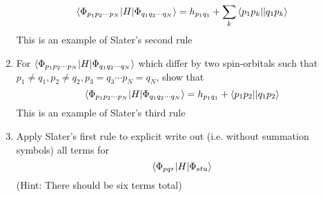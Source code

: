 \documentclass{article}
\newcommand{\cd}{\ensuremath{\cdots} }
\begin{document}
\begin{enumerate}
 \[\braket{\Phi_{p_1 p_2 \cd p_N} | H | \Phi_{q_1 q_2 \cd q_N} } = h_{p_1 q_1}  + \sum_k \braket{p_1 p_k || q_1 p_k}  \]
 This is an example of Slater's second rule
 
 \item For $\braket{\Phi_{p_1 p_2 \cd p_N} | H | \Phi_{q_1 q_2 \cd q_N} }$ which differ by two spin-orbitals such that $p_1 \neq q_1, p_2 \neq q_2, p_3 = q_3 \cd p_N = q_N$, show that
\[\braket{\Phi_{p_1 p_2 \cd p_N} | H | \Phi_{q_1 q_2 \cd q_N} } = h_{p_1 q_1}  +  \braket{p_1 p_2 || q_1 p_2}  \]
   This is an example of Slater's third rule
 \item Apply Slater's first rule to explicit write out (i.e. without summation symbols) all terms for  \[\braket{\Phi_{pqr} | H| \Phi_{stu}} \]
 (Hint: There should be six terms total)
 
\end{enumerate}
\end{document}
